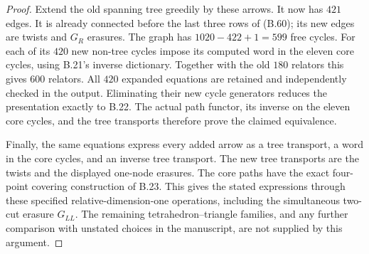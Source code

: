 \begin{proof}
Extend the old spanning tree greedily by these arrows.
It now has $421$ edges.  It is already connected before
the last three rows of (B.60); its new edges are twists
and $G_R$ erasures.  The graph has
$1020-422+1=599$ free cycles.  For each of its $420$ new
non-tree cycles impose its computed word in the eleven
core cycles, using B.21's inverse dictionary.  Together
with the old $180$ relators this gives $600$ relators.
All $420$ expanded equations are retained and independently
checked in the output.  Eliminating their new cycle
generators reduces the presentation exactly to B.22.
The actual path functor, its inverse on the eleven core
cycles, and the tree transports therefore prove the
claimed equivalence.

Finally, the same equations express every added arrow
as a tree transport, a word in the core cycles, and an
inverse tree transport.  The new tree transports are
the twists and the displayed one-node erasures.  The
core paths have the exact four-point covering construction
of B.23.  This gives the stated expressions through
these specified relative-dimension-one operations,
including the simultaneous two-cut erasure $G_{LL}$.
The remaining tetrahedron--triangle families, and any
further comparison with unstated choices in the manuscript,
are not supplied by this argument.
\end{proof}
